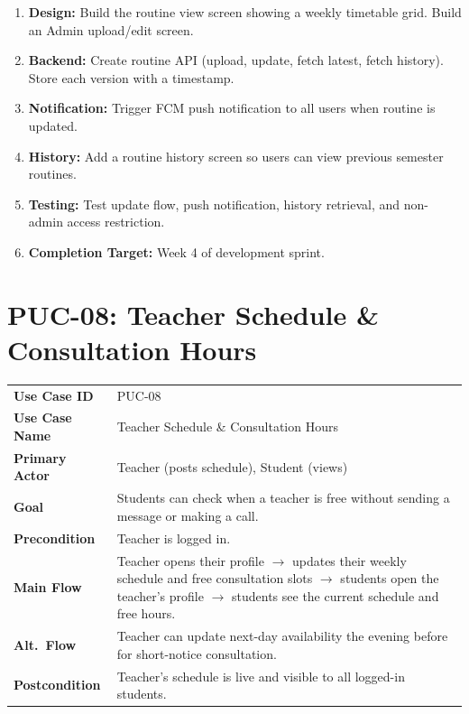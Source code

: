 \documentclass[12pt,a4paper]{article}
\begin{document}
\begin{tcolorbox}[planbox, title={Completion Plan --- PUC-07}]
\begin{enumerate}[leftmargin=*, label=\textbf{Step \arabic*:}, itemsep=4pt]
  \item \textbf{Design:} Build the routine view screen showing a weekly timetable grid. Build an Admin upload/edit screen.
  \item \textbf{Backend:} Create routine API (upload, update, fetch latest, fetch history). Store each version with a timestamp.
  \item \textbf{Notification:} Trigger FCM push notification to all users when routine is updated.
  \item \textbf{History:} Add a routine history screen so users can view previous semester routines.
  \item \textbf{Testing:} Test update flow, push notification, history retrieval, and non-admin access restriction.
  \item \textbf{Completion Target:} Week 4 of development sprint.
\end{enumerate}
\end{tcolorbox}

\newpage
\section{PUC-08: Teacher Schedule \& Consultation Hours}

\begin{tcolorbox}[pucbox, title={Product Use Case --- PUC-08}]
\begin{tabularx}{\linewidth}{p{3.5cm} X}
\textbf{Use Case ID}    & PUC-08 \\
\textbf{Use Case Name}  & Teacher Schedule \& Consultation Hours \\
\textbf{Primary Actor}  & Teacher (posts schedule), Student (views) \\
\textbf{Goal}           & Students can check when a teacher is free without sending a message or making a call. \\
\textbf{Precondition}   & Teacher is logged in. \\
\textbf{Main Flow}      & Teacher opens their profile $\rightarrow$ updates their weekly schedule and free consultation slots $\rightarrow$ students open the teacher's profile $\rightarrow$ students see the current schedule and free hours. \\
\textbf{Alt.\ Flow}     & Teacher can update next-day availability the evening before for short-notice consultation. \\
\textbf{Postcondition}  & Teacher's schedule is live and visible to all logged-in students. \\
\end{tabularx}
\end{tcolorbox}
\end{document}
